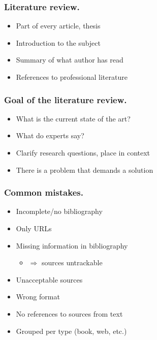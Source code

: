\documentclass[aspectratio=169]{beamer}
\begin{document}
    \begin{frame}
        \frametitle{Literature review.}
        
        \begin{itemize}
            \item Part of every article, thesis
            \item Introduction to the subject
            \item Summary of what author has read
            \item References to professional literature
        \end{itemize}
        
    \end{frame}
    
    \begin{frame}
        \frametitle{Goal of the literature review.}
        
        \begin{itemize}
            \item What is the current state of the art?
            \item What do experts say?
            \item Clarify research questions, place in context
            \item There is a problem that demands a solution
        \end{itemize}
        
        \bigskip
        
    \end{frame}
    
    \begin{frame}
        \frametitle{Common mistakes.}
        
        \begin{itemize}
            \item Incomplete/no bibliography 
            \item Only URLs
            \item Missing information in bibliography
            \begin{itemize}
                \item \(\Rightarrow\) sources untrackable
            \end{itemize}
            \item Unacceptable sources 
            \item Wrong format
            \item No references to sources from text
            \item Grouped per type (book, web, etc.)
        \end{itemize}
    \end{frame}
    
\end{document}
